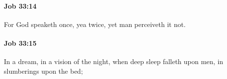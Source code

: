 		\paragraph{Job 33:14} %
			\label{JOB-33-14}

			For God speaketh once, yea twice, yet man perceiveth it not.


		\paragraph{Job 33:15} %
			\label{JOB-33-15}

			In a dream, in a vision of the night, when deep sleep falleth upon men, in slumberings upon the bed;


